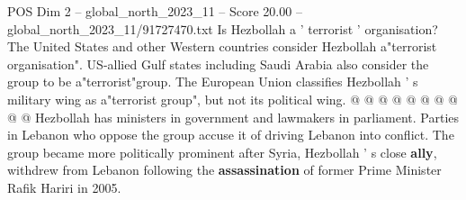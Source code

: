 \begin{textsample}{POS Dim 2 – global\_north\_2023\_11 – Score 20.00 – global\_north\_2023\_11/91727470.txt}
Is Hezbollah a ' terrorist ' organisation?
The United States and other Western countries consider Hezbollah a"terrorist organisation".
US-allied Gulf states including Saudi Arabia also consider the group to be a"terrorist"group.
The European Union classifies Hezbollah ' s military wing as a"terrorist group", but not its political wing. @ @ @ @ @ @ @ @ @ @ Hezbollah has ministers in government and lawmakers in parliament.
Parties in Lebanon who oppose the group accuse it of driving Lebanon into conflict.
The group became more politically prominent after Syria, Hezbollah ' s close \textbf{ally}, withdrew from Lebanon following the \textbf{assassination} of former Prime Minister Rafik Hariri in 2005.

\end{textsample}
